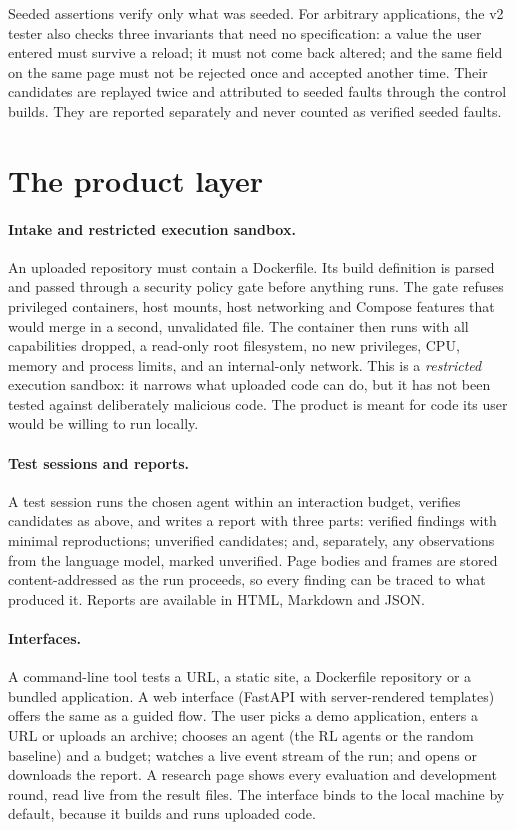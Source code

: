 Seeded assertions verify only what was seeded. For arbitrary applications, the v2 tester
also checks three invariants that need no specification: a value the user entered must
survive a reload; it must not come back altered; and the same field on the same page must
not be rejected once and accepted another time. Their candidates are replayed twice and
attributed to seeded faults through the control builds. They are reported separately and
never counted as verified seeded faults.

\section{The product layer}
\label{sec:product}

\paragraph{Intake and restricted execution sandbox.} An uploaded repository must contain a Dockerfile. Its build
definition is parsed and passed through a security policy gate before anything runs. The
gate refuses privileged containers, host mounts, host networking and Compose features that
would merge in a second, unvalidated file. The container then runs with all capabilities
dropped, a read-only root filesystem, no new privileges, CPU, memory and process limits,
and an internal-only network. This is a \emph{restricted} execution sandbox: it narrows what
uploaded code can do, but it has not been tested against deliberately malicious code. The
product is meant for code its user would be willing to run locally.

\paragraph{Test sessions and reports.} A test session runs the chosen agent within an
interaction budget, verifies candidates as above, and writes a report with three parts:
verified findings with minimal reproductions; unverified candidates; and, separately, any
observations from the language model, marked unverified. Page bodies and frames are stored
content-addressed as the run proceeds, so every finding can be traced to what produced it.
Reports are available in HTML, Markdown and JSON.

\paragraph{Interfaces.} A command-line tool tests a URL, a static site, a Dockerfile
repository or a bundled application. A web interface (FastAPI with server-rendered
templates) offers the same as a guided flow. The user picks a demo application, enters a
URL or uploads an archive; chooses an agent (the RL agents or the random baseline) and a
budget; watches a live event stream of the run; and opens or downloads the report. A
research page shows every evaluation and development round, read live from the result
files. The interface binds to the local machine by default, because it builds and runs
uploaded code.

